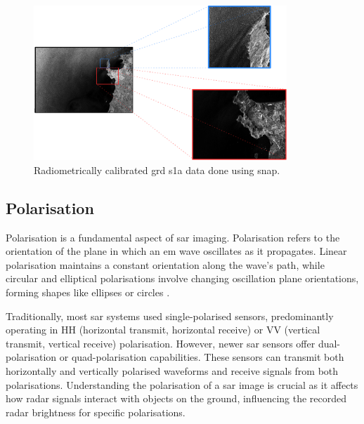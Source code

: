 \begin{figure}[htbp]
    \centering
    \includegraphics[width=0.85\textwidth]{Figures/Theory/radiometricCalibratedSARData.pdf}
    \caption{Radiometrically calibrated \acs{grd} \acs{s1a} data done using \acs{snap}.}
    \label{fig:theory.data.radiometric}
\end{figure}


\subsection{Polarisation} \label{subsec:theory.sar.polarisation}

Polarisation is a fundamental aspect of \acs{sar} imaging. Polarisation refers to the orientation of the plane in which an \acs{em} wave oscillates as it propagates. Linear polarisation maintains a constant orientation along the wave's path, while circular and elliptical polarisations involve changing oscillation plane orientations, forming shapes like ellipses or circles \cite{Meyer2019}.

Traditionally, most \acs{sar} systems used single-polarised sensors, predominantly operating in HH (horizontal transmit, horizontal receive) or VV (vertical transmit, vertical receive) polarisation. However, newer \acs{sar} sensors offer dual-polarisation or quad-polarisation capabilities. These sensors can transmit both horizontally and vertically polarised waveforms and receive signals from both polarisations. Understanding the polarisation of a \acs{sar} image is crucial as it affects how radar signals interact with objects on the ground, influencing the recorded radar brightness for specific polarisations.

